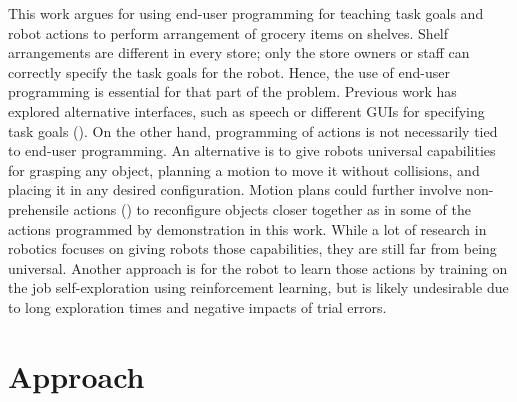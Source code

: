 This work argues for using end-user programming for teaching task goals and robot actions to perform arrangement of grocery items on shelves.
Shelf arrangements are different in every store; only the store owners or staff can correctly specify the task goals for the robot. Hence, the use of end-user programming is essential for that part of the problem. Previous work has explored alternative interfaces, such as speech or different GUIs for specifying task goals (\cite{alexandrova2015roboflow, kurenkov2015,nguyen2013ros}).
On the other hand, programming of actions is not necessarily tied to end-user programming.
An alternative is to give robots universal capabilities for grasping any object, planning a motion to move it without collisions, and placing it in any desired configuration. Motion plans could further involve non-prehensile actions (\cite{dogar2010push,king2015nonprehensile}) to reconfigure objects closer together as in some of the actions programmed by demonstration in this work. While a lot of research in robotics focuses on giving robots those capabilities, they are still far from being universal.
Another approach is for the robot to learn those actions by training on the job \ie self-exploration using reinforcement learning, but is likely undesirable due to long exploration times and negative impacts of trial errors.

\section{Approach}
\label{sec:irosorg-approach}

